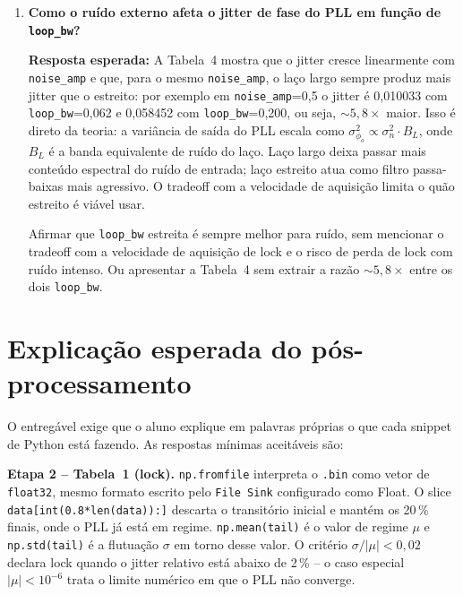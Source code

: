 \documentclass[11pt,a4paper]{article}
\begin{document}
\begin{enumerate}[label=\textbf{Q\arabic*.}, leftmargin=*, itemsep=1em]
    \begin{nota}
      Calcular a faixa de captura em rad/amostra sem converter para Hz, ou usar
      \texttt{loop\_bw} diretamente como a faixa de captura. Ou tratar a
      discrepância de $2{,}5\times$ como erro experimental em vez de
      reconhecer o pull-in lento.
    \end{nota}

  \item \textbf{Como o ruído externo afeta o jitter de fase do PLL em função de \texttt{loop\_bw}?}

    \textbf{Resposta esperada:} A Tabela~4 mostra que o jitter cresce linearmente
    com \texttt{noise\_amp} e que, para o mesmo \texttt{noise\_amp}, o laço largo
    sempre produz mais jitter que o estreito: por exemplo em \texttt{noise\_amp}=0{,}5
    o jitter é 0{,}010033 com \texttt{loop\_bw}=0{,}062 e 0{,}058452 com
    \texttt{loop\_bw}=0{,}200, ou seja, $\sim 5{,}8\times$ maior. Isso é direto da
    teoria: a variância de saída do PLL escala como $\sigma^2_{\phi_o} \propto
    \sigma^2_n \cdot B_L$, onde $B_L$ é a banda equivalente de ruído do laço.
    Laço largo deixa passar mais conteúdo espectral do ruído de entrada; laço
    estreito atua como filtro passa-baixas mais agressivo. O tradeoff com a
    velocidade de aquisição limita o quão estreito é viável usar.

    \begin{nota}
      Afirmar que \texttt{loop\_bw} estreita é sempre melhor para ruído, sem mencionar
      o tradeoff com a velocidade de aquisição de lock e o risco de perda de lock com
      ruído intenso. Ou apresentar a Tabela~4 sem extrair a razão $\sim 5{,}8\times$
      entre os dois \texttt{loop\_bw}.
    \end{nota}

\end{enumerate}

\section*{Explicação esperada do pós-processamento}

O entregável exige que o aluno explique em palavras próprias o que cada
snippet de Python está fazendo. As respostas mínimas aceitáveis são:

\textbf{Etapa 2 -- Tabela~1 (lock).} \texttt{np.fromfile} interpreta o
\texttt{.bin} como vetor de \texttt{float32}, mesmo formato escrito pelo
\texttt{File Sink} configurado como Float. O slice \texttt{data[int(0.8*len(data)):]}
descarta o transitório inicial e mantém os 20\,\% finais, onde o PLL já está em
regime. \texttt{np.mean(tail)} é o valor de regime $\mu$ e \texttt{np.std(tail)}
é a flutuação $\sigma$ em torno desse valor. O critério $\sigma/|\mu| < 0{,}02$
declara lock quando o jitter relativo está abaixo de 2\,\% -- o caso especial
$|\mu| < 10^{-6}$ trata o limite numérico em que o PLL não converge.
\end{document}
